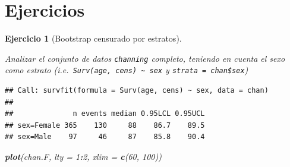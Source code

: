 \documentclass[
]{book}
\newenvironment{Shaded}{\begin{snugshade}}{\end{snugshade}}
\newcommand{\AttributeTok}[1]{\textcolor[rgb]{0.13,0.29,0.53}{#1}}
\newcommand{\CommentTok}[1]{\textcolor[rgb]{0.56,0.35,0.01}{\textit{#1}}}
\newcommand{\DecValTok}[1]{\textcolor[rgb]{0.00,0.00,0.81}{#1}}
\newcommand{\FunctionTok}[1]{\textcolor[rgb]{0.13,0.29,0.53}{\textbf{#1}}}
\newcommand{\NormalTok}[1]{#1}
\newcommand{\OtherTok}[1]{\textcolor[rgb]{0.56,0.35,0.01}{#1}}
\newcommand{\SpecialCharTok}[1]{\textcolor[rgb]{0.81,0.36,0.00}{\textbf{#1}}}
\newcommand{\StringTok}[1]{\textcolor[rgb]{0.31,0.60,0.02}{#1}}
\theoremstyle{break}
\newtheorem{exercise}{Ejercicio}[chapter]
\theoremstyle{nonumberplain}
\renewcommand{\CommentTok}[1]{\textcolor[rgb]{0.41,0.41,0.41}{\texttt{#1}}}
\begin{document}
\section{Ejercicios}\label{ejercicios}

\begin{exercise}[Bootstrap censurado por estratos]
\protect\hypertarget{exr:censboot-strata-ej}{}\label{exr:censboot-strata-ej}

Analizar el conjunto de datos \texttt{channing} completo, teniendo en cuenta el sexo como estrato
(i.e.~\texttt{Surv(age,\ cens)\ \textasciitilde{}\ sex} y \texttt{strata\ =\ chan\$sex})

\begin{Shaded}
\end{Shaded}

\begin{verbatim}
## Call: survfit(formula = Surv(age, cens) ~ sex, data = chan)
## 
##              n events median 0.95LCL 0.95UCL
## sex=Female 365    130     88    86.7    89.5
## sex=Male    97     46     87    85.8    90.4
\end{verbatim}

\begin{Shaded}
\begin{Highlighting}[]
\FunctionTok{plot}\NormalTok{(chan.F, }\AttributeTok{lty =} \DecValTok{1}\SpecialCharTok{:}\DecValTok{2}\NormalTok{, }\AttributeTok{xlim =} \FunctionTok{c}\NormalTok{(}\DecValTok{60}\NormalTok{, }\DecValTok{100}\NormalTok{))}
\end{Highlighting}
\end{Shaded}


\end{exercise}
\end{document}
